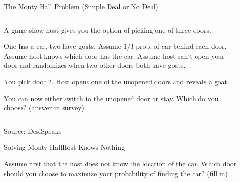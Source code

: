 \documentclass[aspectratio=169]{beamer}
\newenvironment{wideitemize}{\itemize\addtolength{\itemsep}{10pt}}{\enditemize}
\begin{document}
\begin{frame}{The Monty Hall Problem (Simple Deal or No Deal)}
    \begin{columns}[T] %
\begin{column}{.63\textwidth}
\begin{wideitemize}
    \item A game show host gives you the option of picking one of three doors.
    \item One has a car, two have goats. Assume 1/3 prob. of car behind each door. Assume host knows which door has the car. Assume host can't open your door and randomizes when two other doors both have goats.
    \item You pick door 2. Host opens one of the unopened doors and reveals a goat.
    \item You can now either switch to the unopened door or stay. Which do you choose? (answer in survey)
\end{wideitemize}
\end{column}%
\hfill%
\begin{column}{.44\textwidth}
\end{column}%
\end{columns}

  \hfill Source: DesiSpeaks
\end{frame}

\begin{frame}{Solving Monty Hall}{Host Knows Nothing}

Assume first that the host does not know the location of the car. Which door should you choose to maximize your probability of finding the car? (fill in)

\vspace{5.5cm}

\vspace{6cm}

    
\end{frame}
\end{document}
